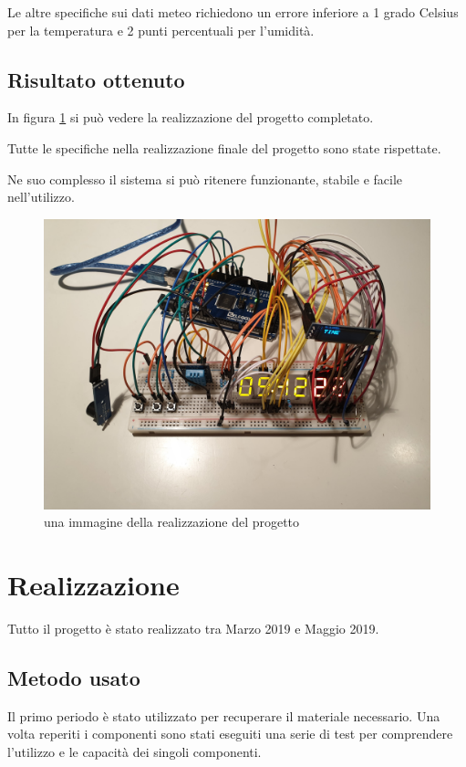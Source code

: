 \documentclass[paper=a4, fontsize=10pt]{scrartcl}
\begin{document}
Le altre specifiche sui dati meteo richiedono un errore inferiore a 1 grado Celsius per la temperatura e 2 punti percentuali per l'umidità.

\subsection{Risultato ottenuto}
In figura \ref{fig:progettoFoto} si può vedere la realizzazione del progetto completato.

Tutte le specifiche nella realizzazione finale del progetto sono state rispettate.

Ne suo complesso il sistema si può ritenere funzionante, stabile e facile nell'utilizzo.

\begin{figure}
  \includegraphics[scale=0.05]{projectPhoto.jpg}
  \caption{una immagine della realizzazione del progetto}
  \label{fig:progettoFoto}
\end{figure}
    

\section{Realizzazione}
Tutto il progetto è stato realizzato tra Marzo 2019 e Maggio 2019.\\

\subsection{Metodo usato}
Il primo periodo è stato utilizzato per recuperare il materiale necessario. Una volta reperiti i componenti sono stati eseguiti una serie di test per comprendere l'utilizzo e le capacità dei singoli componenti.
\end{document}
